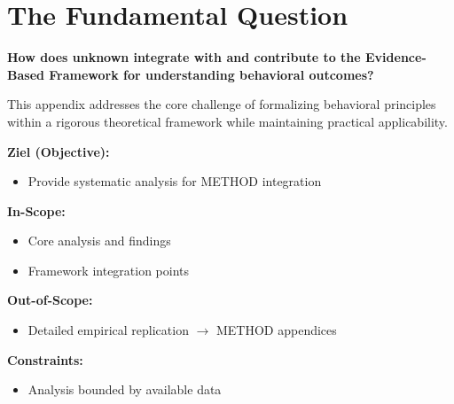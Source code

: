 \section{The Fundamental Question}
\label{sec:srl-fundamental}

\begin{tcolorbox}[
    colback=red!5!white,
    colframe=red!75!black,
    title={\textbf{Fundamental Question}}
]
\textbf{How does unknown integrate with and contribute to the
Evidence-Based Framework for understanding behavioral outcomes?}

This appendix addresses the core challenge of formalizing behavioral principles
within a rigorous theoretical framework while maintaining practical applicability.
\end{tcolorbox}



\begin{tcolorbox}[
    colback=orange!5!white,
    colframe=orange!75!black,
    title={\textbf{Appendix Scope: Ziel / In-Scope / Out-of-Scope / Constraints}},
    fonttitle=\bfseries
]

\textbf{Ziel (Objective):}
\begin{itemize}[nosep]
    \item Provide systematic analysis for METHOD integration
\end{itemize}

\textbf{In-Scope:}
\begin{itemize}[nosep]
    \item Core analysis and findings
    \item Framework integration points
\end{itemize}

\textbf{Out-of-Scope:}
\begin{itemize}[nosep]
    \item Detailed empirical replication $\rightarrow$ METHOD appendices
\end{itemize}

\textbf{Constraints:}
\begin{itemize}[nosep]
    \item Analysis bounded by available data
\end{itemize}

\end{tcolorbox}

